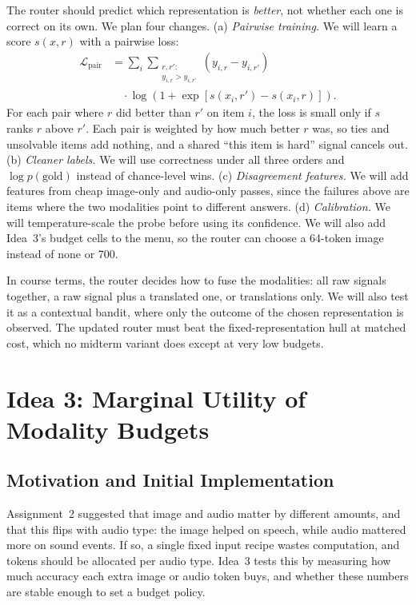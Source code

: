 \documentclass{article}
\begin{document}
The router should predict which representation is \emph{better}, not whether each
one is correct on its own. We plan four changes. (a) \emph{Pairwise training.} We
will learn a score $s(x,r)$ with a pairwise loss:
\begin{equation}
\begin{aligned}
\mathcal{L}_{\text{pair}}
&= \sum_i
\sum_{\substack{r,r':\\ y_{i,r}>y_{i,r'}}}
(y_{i,r}-y_{i,r'}) \\
&\quad \cdot
\log\left(
1+\exp\left[
s(x_i,r')-s(x_i,r)
\right]
\right).
\end{aligned}
\end{equation}
For each pair where $r$ did better than $r'$ on item $i$, the loss is small only if
$s$ ranks $r$ above $r'$. Each pair is weighted by how much better $r$ was, so ties
and unsolvable items add nothing, and a shared ``this item is hard'' signal cancels
out. (b) \emph{Cleaner labels.} We will use correctness under all three orders and
$\log p(\text{gold})$ instead of chance-level wins. (c) \emph{Disagreement
features.} We will add features from cheap image-only and audio-only passes, since
the failures above are items where the two modalities point to different answers.
(d) \emph{Calibration.} We will temperature-scale the probe before using its
confidence. We will also add Idea~3's budget cells to the menu, so the router can
choose a 64-token image instead of none or 700.

In course terms, the router decides how to fuse the modalities: all raw signals
together, a raw signal plus a translated one, or translations only. We will also
test it as a contextual bandit, where only the outcome of the chosen representation
is observed. The updated router must beat the fixed-representation hull at matched
cost, which no midterm variant does except at very low budgets.

\section{Idea 3: Marginal Utility of Modality Budgets}
\label{sec:idea3}

\subsection{Motivation and Initial Implementation}

Assignment~2 suggested that image and audio matter by different amounts, and that
this flips with audio type: the image helped on speech, while audio mattered more on
sound events. If so, a single fixed input recipe wastes computation, and tokens
should be allocated per audio type. Idea~3 tests this by measuring how much accuracy
each extra image or audio token buys, and whether these numbers are stable enough to
set a budget policy.
\end{document}
